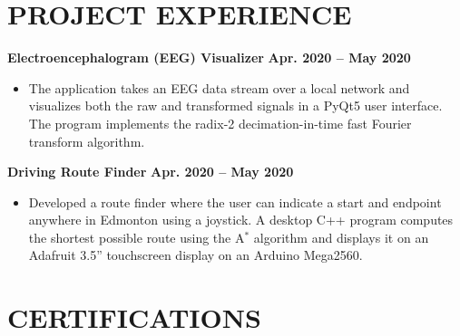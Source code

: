 \documentclass{article}
\begin{document}
\section*{\textcolor{my_colour}{PROJECT EXPERIENCE}}
\vspace{-.25em} \hrulefill \vspace{.75em}

    \textbf{Electroencephalogram (EEG) Visualizer} \hfill \textbf{Apr. 2020 -- May 2020}
    \begin{itemize}
        \item The application takes an EEG data stream over a local network and visualizes both the raw and transformed signals in a PyQt5 user interface. The program implements the radix-2 decimation-in-time fast Fourier transform algorithm.
    \end{itemize}

    \textbf{Driving Route Finder} \hfill \textbf{Apr. 2020 -- May 2020}
    \begin{itemize}
        \item Developed a route finder where the user can indicate a start and endpoint anywhere in Edmonton using a joystick. A desktop C++ program computes the shortest possible route using the A$^*$ algorithm and displays it on an Adafruit 3.5'' touchscreen display on an Arduino Mega2560.
    \end{itemize}


\section*{\textcolor{my_colour}{CERTIFICATIONS}}
\vspace{-.25em} \hrulefill \vspace{.75em}
\end{document}
